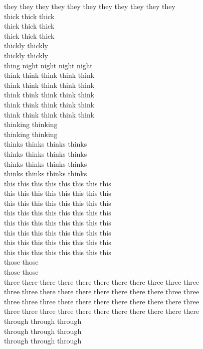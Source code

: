 they they they they they they they they they they they\\
thick thick thick\\
thick thick thick\\
thick thick thick\\
thickly thickly\\
thickly thickly\\
thing night night night night\\
think think think think think\\
think think think think think\\
think think think think think\\
think think think think think\\
think think think think think\\
thinking thinking\\
thinking thinking\\
thinks thinks thinks thinks\\
thinks thinks thinks thinks\\
thinks thinks thinks thinks\\
thinks thinks thinks thinks\\
this this this this this this this this\\
this this this this this this this this\\
this this this this this this this this\\
this this this this this this this this\\
this this this this this this this this\\
this this this this this this this this\\
this this this this this this this this\\
this this this this this this this this\\
those those\\
those those\\
three there there there there there there there three three three\\
three three there there there there there there there three three\\
three three three there there there there there there there three\\
three three three three there there there there there there there\\
through through through\\
through through through\\
through through through\\
